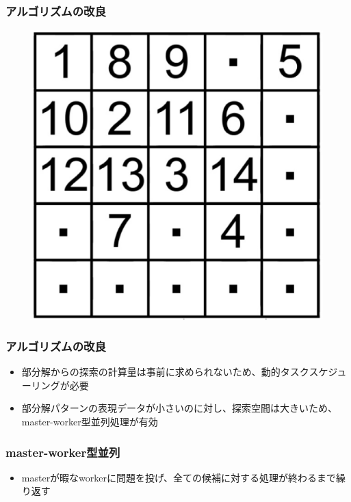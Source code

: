 \documentclass[dvipdfmx,20pt,notheorems,t]{beamer}
\begin{document}
\begin{frame}\frametitle{アルゴリズムの改良}
\begin{figure}[htb]
\centering
\includegraphics[height=0.6\textheight]{order.eps}
\end{figure}
\end{frame}

\begin{frame}\frametitle{アルゴリズムの改良}
\begin{itemize}
\item 部分解からの探索の計算量は事前に求められないため、動的タスクスケジューリングが必要
\item 部分解パターンの表現データが小さいのに対し、探索空間は大きいため、master-worker型並列処理が有効
\end{itemize}
\end{frame}

\begin{frame}\frametitle{master-worker型並列}
\begin{itemize}
\item masterが暇なworkerに問題を投げ、全ての候補に対する処理が終わるまで繰り返す
\end{itemize}
\end{frame}
\end{document}
